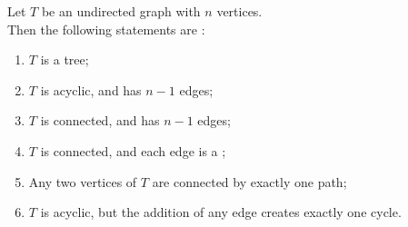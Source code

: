 \begin{frame}{}
  \begin{theorem}
    Let $T$ be an undirected graph with $n$ vertices. \\[3pt]
    Then the following statements are :
    \begin{enumerate}[(1)]
      \setlength{\itemsep}{6pt}
      \item $T$ is a tree;
      \item $T$ is acyclic, and has $n-1$ edges;
      \item $T$ is connected, and has $n-1$ edges;
      \item $T$ is connected, and each edge is a ;
      \item Any two vertices of $T$ are connected by exactly one path;
      \item $T$ is acyclic, but the addition of any edge creates exactly one cycle.
    \end{enumerate}
  \end{theorem}
\end{frame}

\begin{frame}{}
\end{frame}

\begin{frame}{}
\end{frame}

\begin{frame}{}
\end{frame}

\begin{frame}{}
\end{frame}

\begin{frame}{}
\end{frame}

\begin{frame}{}
\end{frame}
